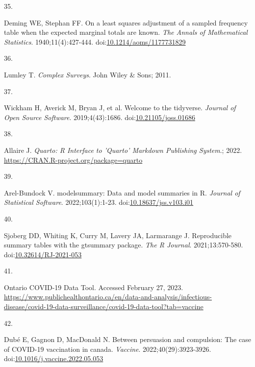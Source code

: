 \documentclass[
  letterpaper,
  DIV=11,
  numbers=noendperiod]{scrartcl}
\newlength{\cslhangindent}
\newlength{\csllabelwidth}
\newlength{\cslentryspacingunit} %
\newenvironment{CSLReferences}[2] %
 {%
  \setlength{\parindent}{0pt}
  \ifodd #1
  \let\oldpar\par
  \def\par{\hangindent=\cslhangindent\oldpar}
  \fi
  \setlength{\parskip}{#2\cslentryspacingunit}
 }%
 {}
\newcommand{\CSLLeftMargin}[1]{\parbox[t]{\csllabelwidth}{#1}}
\newcommand{\CSLRightInline}[1]{\parbox[t]{\linewidth - \csllabelwidth}{#1}\break}
\begin{document}
\begin{CSLReferences}{0}{0}
\leavevmode{}%
\CSLLeftMargin{35. }%
\CSLRightInline{Deming WE, Stephan FF. On a least squares adjustment of
a sampled frequency table when the expected marginal totals are known.
\emph{The Annals of Mathematical Statistics}. 1940;11(4):427-444.
doi:\href{https://doi.org/10.1214/aoms/1177731829}{10.1214/aoms/1177731829}}

\leavevmode{}%
\CSLLeftMargin{36. }%
\CSLRightInline{Lumley T. \emph{Complex Surveys}. John Wiley \& Sons;
2011.}

\leavevmode{}%
\CSLLeftMargin{37. }%
\CSLRightInline{Wickham H, Averick M, Bryan J, et al. Welcome to the
{tidyverse}. \emph{Journal of Open Source Software}. 2019;4(43):1686.
doi:\href{https://doi.org/10.21105/joss.01686}{10.21105/joss.01686}}

\leavevmode{}%
\CSLLeftMargin{38. }%
\CSLRightInline{Allaire J. \emph{Quarto: R Interface to 'Quarto'
Markdown Publishing System}.; 2022.
\url{https://CRAN.R-project.org/package=quarto}}

\leavevmode{}%
\CSLLeftMargin{39. }%
\CSLRightInline{Arel-Bundock V. {modelsummary}: Data and model summaries
in {R}. \emph{Journal of Statistical Software}. 2022;103(1):1-23.
doi:\href{https://doi.org/10.18637/jss.v103.i01}{10.18637/jss.v103.i01}}

\leavevmode{}%
\CSLLeftMargin{40. }%
\CSLRightInline{Sjoberg DD, Whiting K, Curry M, Lavery JA, Larmarange J.
Reproducible summary tables with the gtsummary package. \emph{{The R
Journal}}. 2021;13:570-580.
doi:\href{https://doi.org/10.32614/RJ-2021-053}{10.32614/RJ-2021-053}}

\leavevmode{}%
\CSLLeftMargin{41. }%
\CSLRightInline{{Ontario COVID-19 Data Tool}. Accessed February 27,
2023.
\url{https://www.publichealthontario.ca/en/data-and-analysis/infectious-disease/covid-19-data-surveillance/covid-19-data-tool?tab=vaccine}}

\leavevmode{}%
\CSLLeftMargin{42. }%
\CSLRightInline{Dubé E, Gagnon D, MacDonald N. Between persuasion and
compulsion: The case of {COVID}-19 vaccination in canada.
\emph{Vaccine}. 2022;40(29):3923-3926.
doi:\href{https://doi.org/10.1016/j.vaccine.2022.05.053}{10.1016/j.vaccine.2022.05.053}}


\end{CSLReferences}
\end{document}
